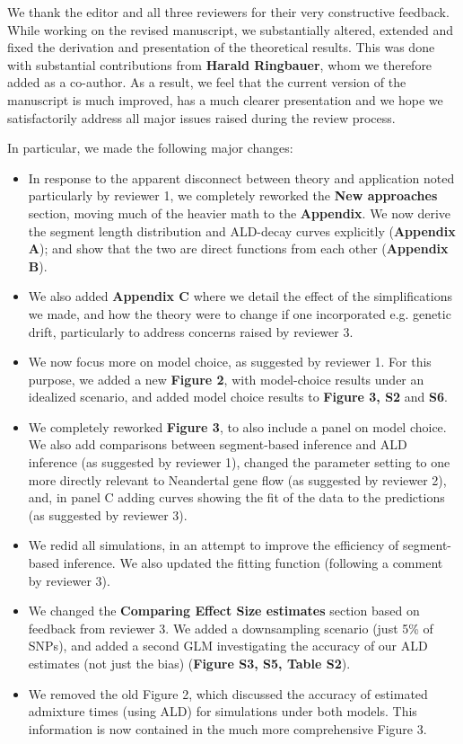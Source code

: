 \documentclass[11pt]{article}
\begin{document}
We thank the editor and all three reviewers for their very constructive feedback. While working on the revised manuscript, we substantially altered, extended and fixed the derivation and presentation of the theoretical results. This was done with substantial contributions from \textbf{Harald Ringbauer}, whom we therefore added as a co-author. As a result, we feel that the current version of the manuscript is much improved, has a much clearer presentation and  we hope we satisfactorily address all major issues raised during the review process.

In particular, we made the following major changes:
\begin{itemize}
    \item In response to the apparent disconnect between theory and application noted particularly by reviewer 1, we completely reworked the \textbf{New approaches} section, moving much of the heavier math to the \textbf{Appendix}. We now derive the segment length distribution and ALD-decay curves explicitly (\textbf{Appendix A}); and show that the two are direct functions from each other (\textbf{Appendix B}).
    \item We also added \textbf{Appendix C} where we detail the effect of the simplifications we made, and how the theory were to change if one incorporated e.g. genetic drift, particularly to address concerns raised by reviewer 3.
    \item We now focus more on model choice, as suggested by reviewer 1. For this purpose, we added a new \textbf{Figure 2}, with model-choice results under an idealized scenario, and added model choice results to \textbf{Figure 3, S2} and  \textbf{S6}.
    \item We completely reworked \textbf{Figure 3}, to also include a panel on model choice. We also add comparisons between segment-based inference and ALD inference (as suggested by reviewer 1), changed the parameter setting to one more directly relevant to Neandertal gene flow (as suggested by reviewer 2), and, in panel C adding curves showing the fit of the data to the predictions (as suggested by reviewer 3).
    \item We redid all simulations, in an attempt to improve the efficiency of segment-based inference. We also updated the fitting function (following a comment by reviewer 3).
    \item We changed the \textbf{Comparing Effect Size estimates} section based on feedback from reviewer 3. We added a downsampling scenario (just 5\% of SNPs), and added a second GLM investigating the accuracy of our ALD estimates (not just the bias) (\textbf{Figure S3, S5, Table S2}).
    \item We removed the old Figure 2, which discussed the accuracy of estimated admixture times (using ALD) for simulations under both models. This information is now contained in the much more comprehensive Figure 3. 
\end{itemize}
\end{document}

